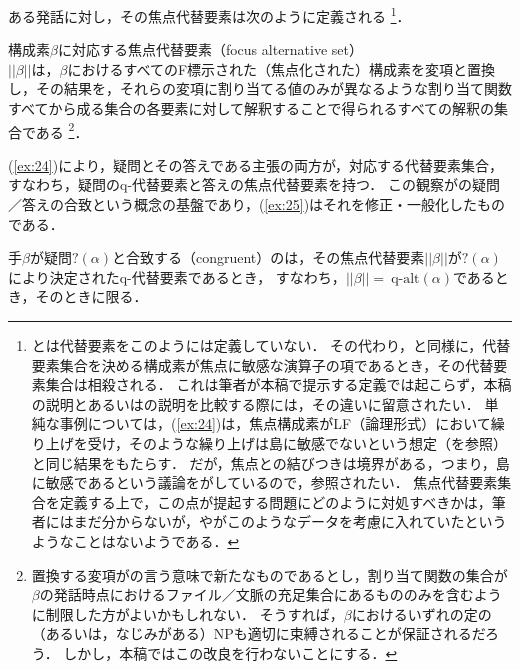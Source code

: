 \documentclass{goken}
\newcommand{\term}[2]{\textsf{#1}（#2）}
\begin{document}
ある発話に対し，その焦点代替要素は次のように定義される
\footnote{%
  \citet{Rooth1985}と\citet{vonStechow1991}は代替要素をこのようには定義していない．
  その代わり，\citealt{Krifka1992}と同様に，代替要素集合を決める構成素が焦点に敏感な演算子の項であるとき，その代替要素集合は相殺される．
  これは筆者が本稿で提示する定義では起こらず，本稿の説明と\citeauthor{Rooth1985,vonStechow1991}あるいは\citeauthor{Krifka1992}の説明を比較する際には，その違いに留意されたい．
  単純な事例については，(\ref{ex:24})は，焦点構成素がLF（論理形式）において繰り上げを受け，そのような繰り上げは島に敏感でないという想定（\citealt{Rooth1992b}を参照）と同じ結果をもたらす．
  だが，焦点との結びつきは境界がある，つまり，島に敏感であるという議論を\citealt{RochemontCulicover1990}がしているので，参照されたい．
  焦点代替要素集合を定義する上で，この点が提起する問題にどのように対処すべきかは，筆者にはまだ分からないが，\citeauthor{Rooth1985}や\citeauthor{vonStechow1991}がこのようなデータを考慮に入れていたというようなことはないようである．
}．

\begin{exe}
	\ex\label{ex:24} 構成素$\beta$に対応する\term{焦点代替要素}{focus alternative set}\\
%
	$||\beta||$は，$\beta$におけるすべてのF標示された（焦点化された）構成素を変項と置換し，その結果を，それらの変項に割り当てる値のみが異なるような割り当て関数すべてから成る集合の各要素に対して解釈することで得られるすべての解釈の集合である
  \footnote{%
    置換する変項が\citet{Heim1982}の言う意味で新たなものであるとし，割り当て関数の集合が$\beta$の発話時点におけるファイル／文脈の充足集合にあるもののみを含むように制限した方がよいかもしれない．
    そうすれば，$\beta$におけるいずれの定の（あるいは，なじみがある）NPも適切に束縛されることが保証されるだろう．
    しかし，本稿ではこの改良を行わないことにする．
  }．
\end{exe}

\noindent
(\ref{ex:24})により，疑問とその答えである主張の両方が，対応する代替要素集合，すなわち，疑問のq-代替要素と答えの焦点代替要素を持つ．
この観察が\citet[36]{vonStechow1991}の疑問／答えの合致という概念の基盤であり，(\ref{ex:25})はそれを修正・一般化したものである．

\begin{exe}
	\ex\label{ex:25}
  手$\beta$が疑問$?(\alpha)$と\term{合致する}{congruent}のは，その焦点代替要素$||\beta||$が$?(\alpha)$により決定されたq-代替要素であるとき，%
  すなわち，$||\beta|| =\ \text{q-alt}(\alpha)$であるとき，そのときに限る．
\end{exe}
\end{document}
